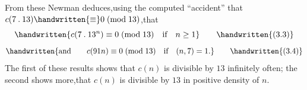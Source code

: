 \noindent\handwritten{\rule{\linewidth}{0.4pt}}

From these Newman deduces,using the computed ``accident'' that $c(7\mathbin{.}13)\handwritten{\equiv}0\;(\mathrm{mod}\;13)$,that
\[
\handwritten{c(7\mathbin{.}13^{n})\equiv0\;(\mathrm{mod}\;13)\quad \text{if}\quad n\geq1}
\tag*{\handwritten{(3.3)}}
\]
\[
\handwritten{\text{and}\qquad c(91n)\equiv0\;(\mathrm{mod}\;13)\quad \text{if}\quad(n,7)=1.}
\tag*{\handwritten{(3.4)}}
\]
The first of these results shows that \uline{$c(n)$} is divisible by $13$ infinitely often; the second shows more,that \uline{$c(n)$} is divisible by $13$ in positive density of \uline{$n$}.


